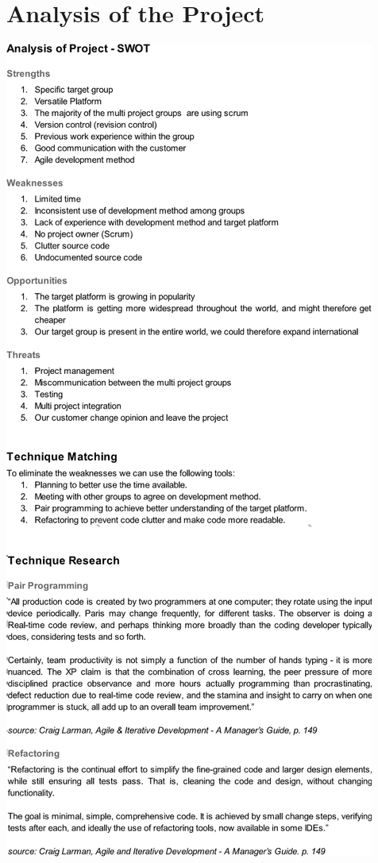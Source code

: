 \section{Analysis of the Project}
\label{sec:swot}
\begin{center}
		\includegraphics[height=\textheight]{Appendix/SWOT.png}
	\end{center}

